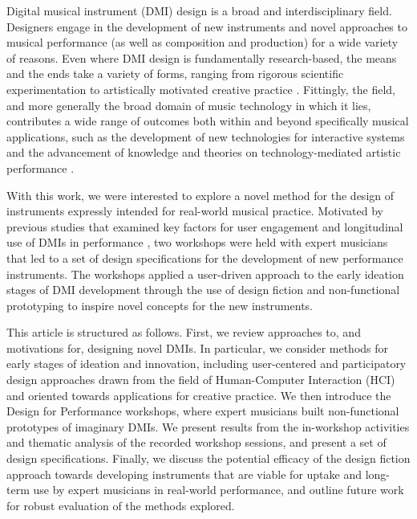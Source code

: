 \documentclass[letterpaper, 12pt]{article}
\begin{document}


Digital musical instrument (DMI) design is a broad and interdisciplinary field. Designers engage in the development of new instruments and novel approaches to musical performance (as well as composition and production) for a wide variety of reasons. Even where DMI design is fundamentally research-based, the means and the ends take a variety of forms, ranging from rigorous scientific experimentation to artistically motivated creative practice \citep{Gurevich2016}. Fittingly, the field, and more generally the broad domain of music technology in which it lies, contributes a wide range of outcomes both within and beyond specifically musical applications, such as the development of new technologies for interactive systems \citep{malloch2018generalized} and the advancement of knowledge and theories on technology-mediated artistic performance \citep{Tahlroglu2020}. 

With this work, we were interested to explore a novel method for the design of instruments expressly intended for real-world musical practice. Motivated by previous studies that examined key factors for user engagement \citep{OBrien2008} and longitudinal use of DMIs in performance \citep{Sullivan2019,Wallis2013}, two workshops were held with expert musicians that led to a set of design specifications for the development of new performance instruments. The workshops applied a user-driven approach to the early ideation stages of DMI development through the use of design fiction \citep{Blythe2014} and non-functional prototyping \citep{Pigrem2018} to inspire novel concepts for the new instruments. 

This article is structured as follows. First, we review approaches to, and motivations for, designing novel DMIs. In particular, we consider methods for early stages of ideation and innovation, including user-centered and participatory design approaches drawn from the field of Human-Computer Interaction (HCI) and oriented towards applications for creative practice. We then introduce the Design for Performance workshops, where expert musicians built non-functional prototypes of imaginary DMIs. We present results from the in-workshop activities and thematic analysis of the recorded workshop sessions, and present a set of design specifications. Finally, we discuss the potential efficacy of the design fiction approach towards developing instruments that are viable for uptake and long-term use by expert musicians in real-world performance, and outline future work for robust evaluation of the methods explored.
\end{document}
